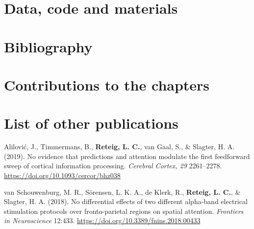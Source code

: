 \documentclass[12pt,american,a4paper,oneside,]{memoir} %
\begin{document}
\hypertarget{resources-supplement}{%
\chapter{Data, code and materials}\label{resources-supplement}}

\backmatter

\hypertarget{bibliography}{%
\chapter*{Bibliography}\label{bibliography}}

\begingroup
\hspace{\parindent}
\setlength{\parindent}{-0.25in}
\setlength{\leftskip}{0.25in}
\setlength{\parskip}{0pt}

\hypertarget{refs}{}

\endgroup

\hypertarget{contributions-to-the-chapters}{%
\chapter*{Contributions to the chapters}\label{contributions-to-the-chapters}}

\setlength{\parindent}{0pt}
\small

\hypertarget{list-of-other-publications}{%
\chapter*{List of other publications}\label{list-of-other-publications}}


Alilović, J., Timmermans, B., \textbf{Reteig, L. C.}, van Gaal, S., \& Slagter, H. A. (2019). No evidence that predictions and attention modulate the first feedforward sweep of cortical information processing. \emph{Cerebral Cortex, 29} 2261--2278. \url{https://doi.org/10.1093/cercor/bhz038}\newline

van Schouwenburg, M. R., Sörensen, L. K. A., de Klerk, R., \textbf{Reteig, L. C.}, \& Slagter, H. A. (2018). No differential effects of two different alpha-band electrical stimulation protocols over fronto-parietal regions on spatial attention. \emph{Frontiers in Neuroscience} 12:433. \url{https://doi.org/10.3389/fnins.2018.00433}\newline
\end{document}
